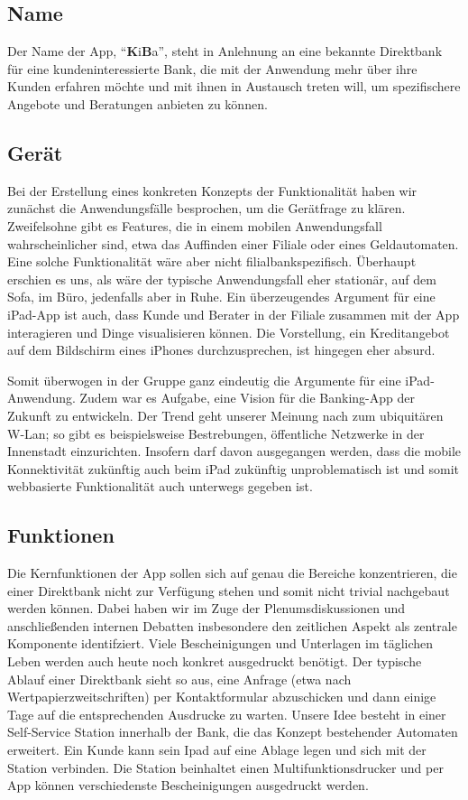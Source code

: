 \subsection{Name}
    Der Name der App, "`\textbf{K}i\textbf{B}a"', steht in Anlehnung an eine bekannte Direktbank für eine kundeninteressierte Bank, die mit der Anwendung mehr über ihre Kunden erfahren möchte und mit ihnen in Austausch treten will, um spezifischere Angebote und Beratungen anbieten zu können.
    
\subsection{Gerät}
    Bei der Erstellung eines konkreten Konzepts der Funktionalität haben wir zunächst die Anwendungsfälle besprochen, um die Gerätfrage zu klären. Zweifelsohne gibt es Features, die in einem mobilen Anwendungsfall wahrscheinlicher sind, etwa das Auffinden einer Filiale oder eines Geldautomaten. Eine solche Funktionalität wäre aber nicht filialbankspezifisch. Überhaupt erschien es uns, als wäre der typische Anwendungsfall eher stationär, auf dem Sofa, im Büro, jedenfalls aber in Ruhe. Ein überzeugendes Argument für eine iPad-App ist auch, dass Kunde und Berater in der Filiale zusammen mit der App interagieren und Dinge visualisieren können. Die Vorstellung, ein Kreditangebot auf dem Bildschirm eines iPhones durchzusprechen, ist hingegen eher absurd. 
    
    
    Somit überwogen in der Gruppe ganz eindeutig die Argumente für eine iPad-Anwendung. Zudem war es Aufgabe, eine Vision für die Banking-App der Zukunft zu entwickeln. Der Trend geht unserer Meinung nach zum ubiquitären W-Lan; so gibt es beispielsweise Bestrebungen, öffentliche Netzwerke in der Innenstadt einzurichten. Insofern darf davon ausgegangen werden, dass die mobile Konnektivität zukünftig auch beim iPad zukünftig unproblematisch ist und somit webbasierte Funktionalität auch unterwegs gegeben ist.
    

\subsection{Funktionen}
    Die Kernfunktionen der App sollen sich auf genau die Bereiche konzentrieren, die einer Direktbank nicht zur Verfügung stehen und somit nicht trivial nachgebaut werden können. Dabei haben wir im Zuge der Plenumsdiskussionen und anschließenden internen Debatten insbesondere den zeitlichen Aspekt als zentrale Komponente identifziert. Viele Bescheinigungen und Unterlagen im täglichen Leben werden auch heute noch konkret ausgedruckt benötigt. Der typische Ablauf einer Direktbank sieht so aus, eine Anfrage (etwa nach Wertpapierzweitschriften) per Kontaktformular abzuschicken und dann einige Tage auf die entsprechenden Ausdrucke zu warten. Unsere Idee besteht in einer Self-Service Station innerhalb der Bank, die das Konzept bestehender Automaten erweitert. Ein Kunde kann sein Ipad auf eine Ablage legen und sich mit der Station verbinden. Die Station beinhaltet einen Multifunktionsdrucker und per App können verschiedenste Bescheinigungen ausgedruckt werden. 
    
